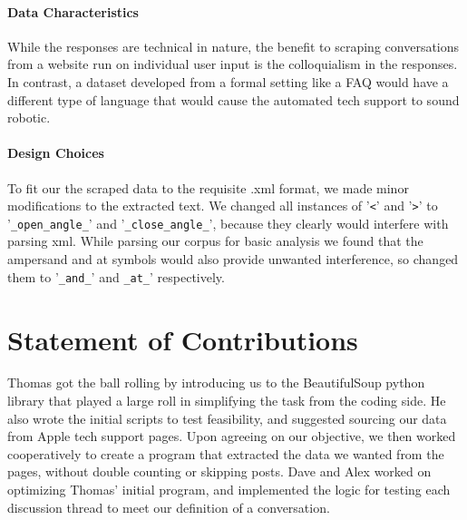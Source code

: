\documentclass[12pt]{article}
\begin{document}
\paragraph{Data Characteristics}
While the responses are technical in nature, the benefit to scraping conversations from a website run on individual user input is the colloquialism in the responses. In contrast, a dataset developed from a formal setting like a FAQ would have a different type of language that would cause the automated tech support to sound robotic.\\

\paragraph{Design Choices}
To fit our the scraped data to the requisite .xml format, we made minor modifications to the extracted text. We changed all instances of '\texttt{<}' and '\texttt{>}' to '\texttt{\_open\_angle\_}' and '\texttt{\_close\_angle\_}', because they clearly would interfere with parsing xml. While parsing our corpus for basic analysis we found that the ampersand and at symbols would also provide unwanted interference, so changed them to '\texttt{\_and\_}' and \texttt{\_at\_}' respectively.




\section{Statement of Contributions}
Thomas got the ball rolling by introducing us to the BeautifulSoup python library that played a large roll in simplifying the task from the coding side. He also wrote the initial scripts to test feasibility, and suggested sourcing our data from Apple tech support pages. Upon agreeing on our objective, we then worked cooperatively to create a program that extracted the data we wanted from the pages, without double counting or skipping posts. Dave and Alex worked on optimizing Thomas' initial program, and implemented the logic for testing each discussion thread to meet our definition of a conversation. \\
\end{document}
